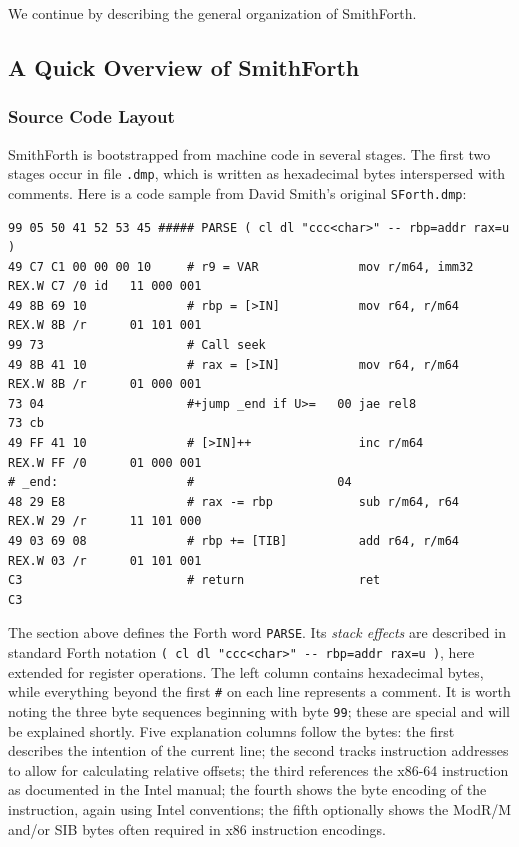 \documentclass[a4paper,12pt,final]{article}
\begin{document}
We continue by describing the general organization of SmithForth.


\subsection{A Quick Overview of SmithForth}
\label{sec:org28d2a14}

\subsubsection{Source Code Layout}
\label{sec:org9da1528}

SmithForth is bootstrapped from machine code in several stages.  The
first two stages occur in file \texttt{.dmp}, which is written as hexadecimal
bytes interspersed with comments.  Here is a code sample from David
Smith's original \texttt{SForth.dmp}:

\fontsize{9ptpt}{10.800000pt}\selectfont

\begin{verbatim}
99 05 50 41 52 53 45 ##### PARSE ( cl dl "ccc<char>" -- rbp=addr rax=u )
49 C7 C1 00 00 00 10     # r9 = VAR              mov r/m64, imm32    REX.W C7 /0 id   11 000 001
49 8B 69 10              # rbp = [>IN]           mov r64, r/m64      REX.W 8B /r      01 101 001
99 73                    # Call seek				         		      
49 8B 41 10              # rax = [>IN]           mov r64, r/m64      REX.W 8B /r      01 000 001
73 04                    #+jump _end if U>=   00 jae rel8            73 cb	      
49 FF 41 10              # [>IN]++               inc r/m64           REX.W FF /0      01 000 001
# _end:                  #                    04		         		      
48 29 E8                 # rax -= rbp            sub r/m64, r64      REX.W 29 /r      11 101 000
49 03 69 08              # rbp += [TIB]          add r64, r/m64      REX.W 03 /r      01 101 001
C3                       # return                ret                 C3    
\end{verbatim}
\normalsize

The section above defines the Forth word \texttt{PARSE}.  Its \emph{stack effects}
are described in standard Forth notation \texttt{( cl dl "ccc<char>" -{}-{}
rbp=addr rax=u )}​, here extended for register operations.  The left
column contains hexadecimal bytes, while everything beyond the first
\texttt{\#} on each line represents a comment.  It is worth noting the three
byte sequences beginning with byte \texttt{99}; these are special and will be
explained shortly.  Five explanation columns follow the bytes: the
first describes the intention of the current line; the second tracks
instruction addresses to allow for calculating relative offsets; the
third references the x86-64 instruction as documented in the Intel
manual; the fourth shows the byte encoding of the instruction, again
using Intel conventions; the fifth optionally shows the ModR/M and/or
SIB bytes often required in x86 instruction encodings.
\end{document}
